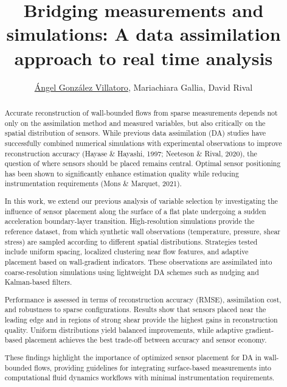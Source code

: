 \documentclass[10pt]{article}
\title{Bridging measurements and simulations: A data assimilation approach to real time analysis}
\author{\underline{Ángel González Villatoro}, Mariachiara Gallia, David Rival}
\affil{Institut für Strömungsmechanik, Technische Universität Braunschweig, Germany }
\begin{document}
\maketitle

\begin{abstract}
Accurate reconstruction of wall-bounded flows from sparse measurements depends not 
only on the assimilation method and measured variables, but also critically on the 
spatial distribution of sensors. While previous data assimilation (DA) studies have 
successfully combined numerical simulations with experimental observations to improve 
reconstruction accuracy (Hayase \& Hayashi, 1997; Neeteson \& Rival, 2020), the question 
of where sensors should be placed remains central. Optimal sensor positioning has been 
shown to significantly enhance estimation quality while reducing instrumentation 
requirements (Mons \& Marquet, 2021).

In this work, we extend our previous analysis of variable selection by investigating 
the influence of sensor placement along the surface of a flat plate undergoing a sudden 
acceleration boundary-layer transition. High-resolution simulations provide the reference 
dataset, from which synthetic wall observations (temperature, pressure, shear stress) 
are sampled according to different spatial distributions. Strategies tested include 
uniform spacing, localized clustering near flow features, and adaptive placement based 
on wall-gradient indicators. These observations are assimilated into coarse-resolution 
simulations using lightweight DA schemes such as nudging and Kalman-based filters.

Performance is assessed in terms of reconstruction accuracy (RMSE), assimilation cost, 
and robustness to sparse configurations. Results show that sensors placed near the 
leading edge and in regions of strong shear provide the highest gains in reconstruction 
quality. Uniform distributions yield balanced improvements, while adaptive gradient-based 
placement achieves the best trade-off between accuracy and sensor economy.

These findings highlight the importance of optimized sensor placement for DA in 
wall-bounded flows, providing guidelines for integrating surface-based measurements into 
computational fluid dynamics workflows with minimal instrumentation requirements.
\end{abstract}
\end{document}
